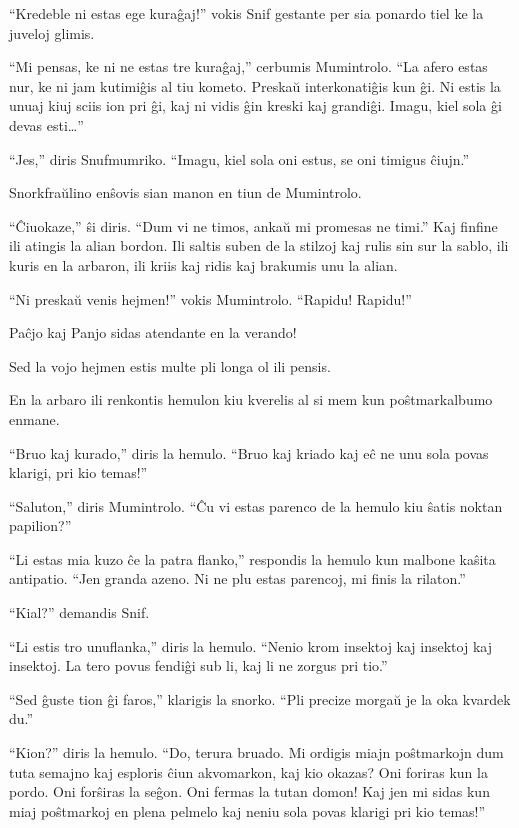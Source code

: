 ``Kredeble ni estas ege kuraĝaj!'' vokis Snif gestante per sia ponardo tiel ke la juveloj glimis.

``Mi pensas, ke ni ne estas tre kuraĝaj,'' cerbumis Mumintrolo. ``La afero estas nur, ke ni jam kutimiĝis al tiu kometo. Preskaŭ interkonatiĝis kun ĝi. Ni estis la unuaj kiuj sciis ion pri ĝi, kaj ni vidis ĝin kreski kaj grandiĝi. Imagu, kiel sola ĝi devas esti{\ldots}''

``Jes,'' diris Snufmumriko. ``Imagu, kiel sola oni estus, se oni timigus ĉiujn.''

Snorkfraŭlino enŝovis sian manon en tiun de Mumintrolo.

``Ĉiuokaze,'' ŝi diris. ``Dum vi ne timos, ankaŭ mi promesas ne timi.''
\sectionbreak
Kaj finfine ili atingis la alian bordon. Ili saltis suben de la stilzoj kaj rulis sin sur la sablo, ili kuris en la arbaron, ili kriis kaj ridis kaj brakumis unu la alian.

``Ni preskaŭ venis hejmen!'' vokis Mumintrolo. ``Rapidu! Rapidu!''

Paĉjo kaj Panjo sidas atendante en la verando!

Sed la vojo hejmen estis multe pli longa ol ili pensis.

En la arbaro ili renkontis hemulon kiu kverelis al si mem kun poŝtmarkalbumo enmane.

``Bruo kaj kurado,'' diris la hemulo. ``Bruo kaj kriado kaj eĉ ne unu sola povas klarigi, pri kio temas!''

``Saluton,'' diris Mumintrolo. ``Ĉu vi estas parenco de la hemulo kiu ŝatis noktan papilion?''

``Li estas mia kuzo ĉe la patra flanko,'' respondis la hemulo kun malbone kaŝita antipatio. ``Jen granda azeno. Ni ne plu estas parencoj, mi finis la rilaton.''

``Kial?'' demandis Snif.

``Li estis tro unuflanka,'' diris la hemulo. ``Nenio krom insektoj kaj insektoj kaj insektoj. La tero povus fendiĝi sub li, kaj li ne zorgus pri tio.''

``Sed ĝuste tion ĝi faros,'' klarigis la snorko. ``Pli precize morgaŭ je la oka kvardek du.''

``Kion?'' diris la hemulo. ``Do, terura bruado. Mi ordigis miajn poŝtmarkojn dum tuta semajno kaj esploris ĉiun akvomarkon, kaj kio okazas? Oni foriras kun la pordo. Oni forŝiras la seĝon. Oni fermas la tutan domon! Kaj jen mi sidas kun miaj poŝtmarkoj en plena pelmelo kaj neniu sola povas klarigi pri kio temas!''

